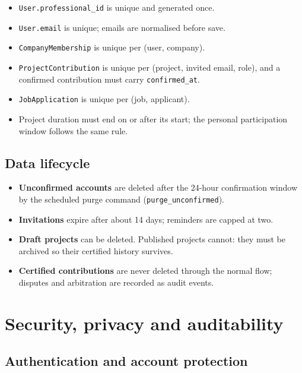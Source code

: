 \documentclass[11pt,a4paper]{article}
\begin{document}
\begin{itemize}[leftmargin=1.4em,itemsep=3pt]
  \item \texttt{User.professional\_id} is unique and generated once.
  \item \texttt{User.email} is unique; emails are normalised before save.
  \item \texttt{CompanyMembership} is unique per (user, company).
  \item \texttt{ProjectContribution} is unique per (project, invited email,
        role), and a confirmed contribution must carry \texttt{confirmed\_at}.
  \item \texttt{JobApplication} is unique per (job, applicant).
  \item Project duration must end on or after its start; the personal
        participation window follows the same rule.
\end{itemize}

\subsection{Data lifecycle}

\begin{itemize}[leftmargin=1.4em,itemsep=3pt]
  \item \textbf{Unconfirmed accounts} are deleted after the 24-hour
        confirmation window by the scheduled purge command
        (\texttt{purge\_unconfirmed}).
  \item \textbf{Invitations} expire after about 14 days; reminders are capped at
        two.
  \item \textbf{Draft projects} can be deleted. Published projects cannot: they
        must be archived so their certified history survives.
  \item \textbf{Certified contributions} are never deleted through the normal
        flow; disputes and arbitration are recorded as audit events.
\end{itemize}

\section{Security, privacy and auditability}
\label{sec:security}

\subsection{Authentication and account protection}
\end{document}

